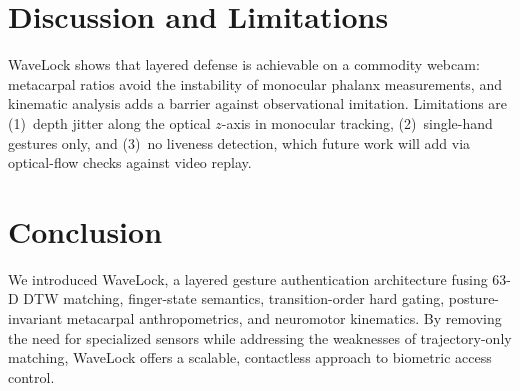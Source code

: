 \documentclass[conference]{IEEEtran}
\begin{document}
\section{Discussion and Limitations}
\label{sec:discussion}

WaveLock shows that layered defense is achievable on a commodity webcam: metacarpal ratios avoid the instability of monocular phalanx measurements, and kinematic analysis adds a barrier against observational imitation. Limitations are (1)~depth jitter along the optical $z$-axis in monocular tracking, (2)~single-hand gestures only, and (3)~no liveness detection, which future work will add via optical-flow checks against video replay.

\section{Conclusion}
\label{sec:conclusion}

We introduced WaveLock, a layered gesture authentication architecture fusing 63-D DTW matching, finger-state semantics, transition-order hard gating, posture-invariant metacarpal anthropometrics, and neuromotor kinematics. By removing the need for specialized sensors while addressing the weaknesses of trajectory-only matching, WaveLock offers a scalable, contactless approach to biometric access control.
\end{document}

